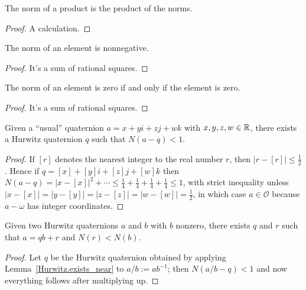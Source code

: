 \begin{lemma}
    \label{Hurwitz.norm_mul}
    \leanok
    The norm of a product is the product of the norms.
\end{lemma}
\begin{proof}
    \leanok
    A calculation.
\end{proof}

\begin{lemma}
    \label{Hurwitz.norm_nonneg}
    \leanok
    The norm of an element is nonnegative.
\end{lemma}
\begin{proof} \leanok
    It's a sum of rational squares.
\end{proof}

\begin{lemma}
    \label{Hurwitz.norm_eq_zero}
    \leanok
    The norm of an element is zero if and only if the element is zero.
\end{lemma}
\begin{proof}
    \leanok
    It's a sum of rational squares.
\end{proof}

\begin{lemma}
    \label{Hurwitz.exists_near}
    \leanok
    Given a ``usual'' quaternion $a=x+yi+zj+wk$ with $x,y,z,w\in\mathbb{R}$,
    there exists a Hurwitz quaternion $q$ such that $N(a-q)<1$.
\end{lemma}
\begin{proof}
    \leanok
  If $[r]$ denotes the nearest integer to the real number $r$, then $|r-[r]|\leq \frac{1}{2}$.
  Hence if $q=[x]+[y]i+[z]j+[w]k$ then $N(a-q)=|x-[x]|^2+\cdots
  \leq \frac{1}{4}+\frac{1}{4}+\frac{1}{4}+\frac{1}{4}\leq 1$, with strict inequality unless
  $|x-[x]|=|y-[y]|=|z-[z]|=|w-[w]|=\frac{1}{2}$, in which case $a\in\mathcal{O}$ because $a-\omega$
  has integer coordinates.
\end{proof}

\begin{lemma}
    \label{Hurwitz.quot_rem}
    \leanok
    Given two Hurwitz quaternions $a$ and $b$ with $b$ nonzero, there exists
    $q$ and $r$ such that $a=qb+r$ and $N(r)<N(b)$.
\end{lemma}
\begin{proof}
    \leanok
  Let $q$ be the Hurwitz quaternion obtained by applying Lemma~\ref{Hurwitz.exists_near}
  to $a/b := ab^{-1}$; then $N(a/b-q)<1$ and now everything follows after multiplying up.
\end{proof}

